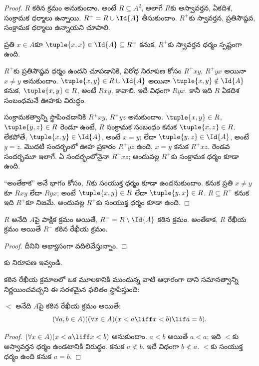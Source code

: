 \documentclass[../../../include/open-logic-section]{subfiles}
\begin{document}
\begin{proof}
$R$ కఠిన క్రమం అనుకుందాం. అంటే $R \subseteq A^2$, అలాగే
$R$కు అస్వావర్తన, ఏకదిశ, సంక్రామక ధర్మాలు ఉన్నాయి.
$R^+ = R \cup \Id{A}$ తీసుకుందాం.
$R^+$కు స్వావర్తన, ప్రతిసౌష్ఠవ, సంక్రామక ధర్మాలు ఉన్నాయని చూపాలి.

ప్రతి $x \in A$కూ $\tuple{x, x} \in \Id{A} \subseteq R^+$
కనుక, $R^+$కు స్వావర్తన ధర్మం స్పష్టంగా ఉంది.

$R^+$కు ప్రతిసౌష్ఠవ ధర్మం ఉందని చూపడానికి, విరోధ నిరూపణ కోసం
$R^+xy$, $R^+yx$ అయినా $x \neq y$ అనుకుందాం.
$\tuple{x,y} \in R \cup \Id{A}$ అయినా
$\tuple{x, y} \notin \Id{A}$ కనుక,
$\tuple{x, y} \in R$, అంటే $Rxy$, కావాలి.
ఇదే విధంగా $Ryx$. కానీ ఇది $R$ ఏకదిశ సంబంధమనే ఊహకు విరుద్ధం.

సంక్రామకత్వాన్ని స్థాపించడానికి $R^+xy$, $R^+yz$ అనుకుందాం.
$\tuple{x, y} \in R$, $\tuple{y,z} \in R$ రెండూ ఉంటే,
$R$ సంక్రామక సంబంధం కనుక $\tuple{x, z} \in R$.
లేకపోతే, $\tuple{x, y} \in \Id{A}$, అంటే $x = y$;
లేదా $\tuple{y, z} \in \Id{A}$, అంటే $y = z$.
మొదటి సందర్భంలో ఊహ ప్రకారం $R^+yz$ ఉంది, $x = y$ కనుక $R^+xz$.
రెండవ సందర్భమూ ఇలాగే. ఏ సందర్భంలోనైనా $R^+xz$;
అందువల్ల $R^+$కు సంక్రామక ధర్మం కూడా ఉంది.

``అంతేకాక'' అనే భాగం కోసం, $R$కు సంయుక్త ధర్మం కూడా ఉందనుకుందాం.
కనుక ప్రతి $x \neq y$కూ $Rxy$ లేదా $Ryx$;
అంటే $\tuple{x, y} \in R$ లేదా $\tuple{y, x} \in R$.
$R \subseteq R^+$ కనుక ఇది $R^+$కూ నిజమే.
అందువల్ల $R^+$కు సంయుక్త ధర్మం కూడా ఉంది.
\end{proof}

\begin{prop}
$R$ అనేది $A$పై పాక్షిక క్రమం అయితే,
$R^- = R \setminus \Id{A}$ కఠిన క్రమం.
అంతేకాక, $R$ రేఖీయ క్రమం అయితే $R^-$ కఠిన రేఖీయ క్రమం.
\end{prop}

\begin{proof}
దీనిని అభ్యాసంగా వదిలివేస్తున్నాం.
\end{proof}

\begin{prob}
కు నిరూపణ ఇవ్వండి.
\end{prob}

కఠిన రేఖీయ క్రమాలలో ఒక మూలకానికి ముందున్న వాటి ఆధారంగా దాని
సమానత్వాన్ని నిర్ణయించవచ్చని ఈ సరళమైన ఫలితం స్థాపిస్తుంది:

\begin{prop}
$<$ అనేది $A$పై కఠిన రేఖీయ క్రమం అయితే:
\[
  (\forall a, b \in A)((\forall x \in A)(x < a \liff x < b) \lif a = b).
\]
\end{prop}

\begin{proof}
$(\forall x \in A)(x < a \liff x < b)$ అనుకుందాం.
$a < b$ అయితే $a < a$; ఇది $<$కు అస్వావర్తన ధర్మం ఉండటానికి
విరుద్ధం. కనుక $a \nless b$.
ఇదే విధంగా $b \nless a$. $<$కు సంయుక్త ధర్మం ఉంది కనుక $a = b$.
\end{proof}
\end{document}
